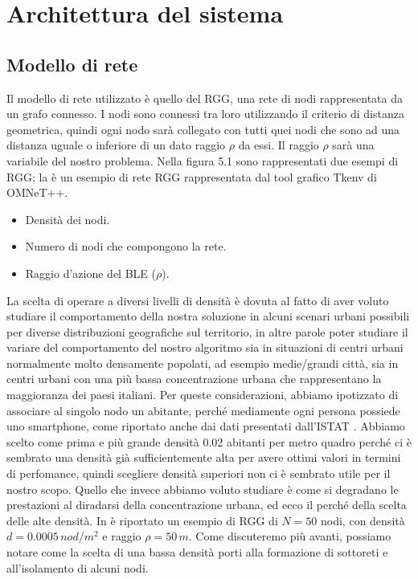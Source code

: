 \chapter{Architettura del sistema}
\label{chap:architettura}

\section{Modello di rete}
\label{sec:modello_rete}
Il modello di rete utilizzato è quello del \acf{RGG}, una rete di nodi rappresentata da un grafo connesso. I nodi sono connessi tra loro utilizzando il criterio di distanza geometrica, quindi ogni nodo sarà collegato con tutti quei nodi che sono ad una distanza uguale o inferiore di un dato raggio $\rho$ da essi. Il raggio $\rho$ sarà una variabile del nostro problema. Nella figura 5.1 sono rappresentati due esempi di \acs{RGG}; la  è un esempio di rete \acs{RGG} rappresentata dal tool grafico Tkenv di OMNeT++.
\medskip

\begin{itemize}
	\item Densità dei nodi.
	\item Numero di nodi che compongono la rete.
	\item Raggio d'azione del \acs{BLE} (\textit{$\rho$}).
\end{itemize}
La scelta di operare a diversi livelli di densità è dovuta al fatto di aver voluto studiare il comportamento della nostra soluzione in alcuni scenari urbani possibili per diverse distribuzioni geografiche sul territorio, in altre parole poter studiare il variare del comportamento del nostro algoritmo sia in situazioni di centri urbani normalmente molto densamente popolati, ad esempio medie/grandi città, sia in centri urbani con una più bassa concentrazione urbana che rappresentano la maggioranza dei paesi italiani.
Per queste considerazioni, abbiamo ipotizzato di associare al singolo nodo un abitante, perché mediamente ogni persona possiede uno smartphone, come riportato anche dai dati presentati dall'ISTAT \cite{istat2014}. Abbiamo scelto come prima e più grande densità 0.02 abitanti per metro quadro perché ci è sembrato una densità già sufficientemente alta per avere ottimi valori in termini di perfomance, quindi scegliere densità superiori non ci è sembrato utile per il nostro scopo. Quello che invece abbiamo voluto studiare è come si degradano le prestazioni al diradarsi della concentrazione urbana, ed ecco il perché della scelta delle alte densità. In  è riportato un esempio di RGG di $ N=50 $ nodi, con densità $ d=0.0005\,nod/m^2$ e raggio $ \rho=50\,m $. Come discuteremo più avanti, possiamo notare come la scelta di una bassa densità porti alla formazione di sottoreti e all'isolamento di alcuni nodi.
\medskip

